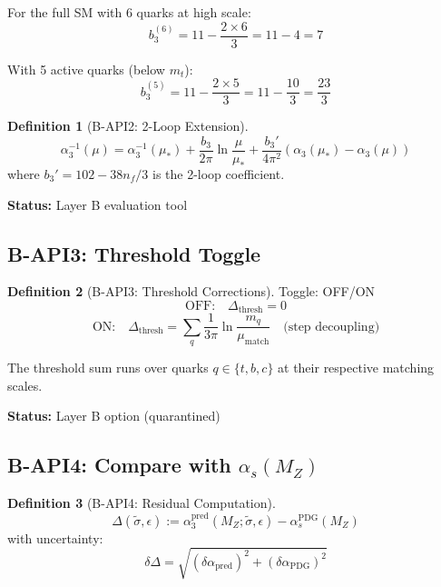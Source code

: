 \documentclass[11pt,a4paper]{article}
\theoremstyle{definition}
\newtheorem{definition}{Definition}[section]
\begin{document}
For the full SM with 6 quarks at high scale:
\begin{equation}
\label{eq:b3-full}
b_3^{(6)} = 11 - \frac{2 \times 6}{3} = 11 - 4 = 7
\end{equation}

With 5 active quarks (below $m_t$):
\begin{equation}
\label{eq:b3-5f}
b_3^{(5)} = 11 - \frac{2 \times 5}{3} = 11 - \frac{10}{3} = \frac{23}{3}
\end{equation}

\begin{definition}[B-API2: 2-Loop Extension]
\label{def:b-api2-2loop}
\begin{equation}
\label{eq:b-api2-2loop}
\alpha_3^{-1}(\mu) = \alpha_3^{-1}(\mu_*) + \frac{b_3}{2\pi} \ln\frac{\mu}{\mu_*}
  + \frac{b_3'}{4\pi^2} \left(\alpha_3(\mu_*) - \alpha_3(\mu)\right)
\end{equation}
where $b_3' = 102 - 38n_f/3$ is the 2-loop coefficient.
\end{definition}

\textbf{Status:} Layer B evaluation tool

\subsection{B-API3: Threshold Toggle}
\label{subsec:b-api3}

\begin{definition}[B-API3: Threshold Corrections]
\label{def:b-api3}
Toggle: OFF/ON
\begin{equation}
\label{eq:b-api3-off}
\text{OFF:} \quad \Delta_{\text{thresh}} = 0
\end{equation}
\begin{equation}
\label{eq:b-api3-on}
\text{ON:} \quad \Delta_{\text{thresh}} = \sum_q \frac{1}{3\pi} \ln\frac{m_q}{\mu_{\text{match}}}
  \quad \text{(step decoupling)}
\end{equation}
\end{definition}

The threshold sum runs over quarks $q \in \{t, b, c\}$ at their respective
matching scales.

\textbf{Status:} Layer B option (quarantined)

\subsection{B-API4: Compare with $\alpha_s(M_Z)$}
\label{subsec:b-api4}

\begin{definition}[B-API4: Residual Computation]
\label{def:b-api4}
\begin{equation}
\label{eq:b-api4}
\boxed{\Delta(\tilde{\sigma}, \epsilon) := \alpha_3^{\text{pred}}(M_Z; \tilde{\sigma}, \epsilon)
  - \alpha_s^{\text{PDG}}(M_Z)}
\end{equation}
with uncertainty:
\begin{equation}
\label{eq:b-api4-uncert}
\delta\Delta = \sqrt{(\delta\alpha_{\text{pred}})^2 + (\delta\alpha_{\text{PDG}})^2}
\end{equation}
\end{definition}
\end{document}
